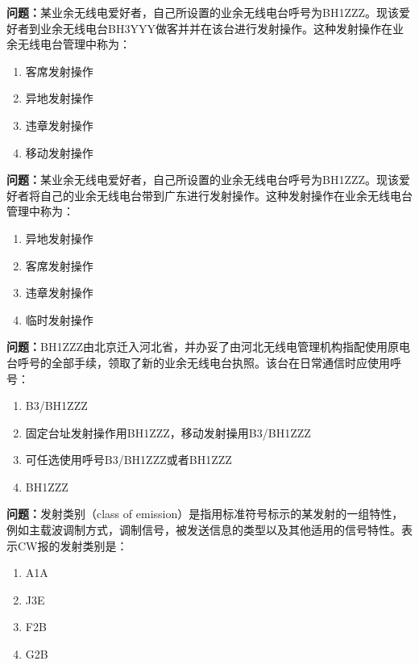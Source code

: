 \bigskip


\noindent\textbf{问题：}某业余无线电爱好者，自己所设置的业余无线电台呼号为BH1ZZZ。现该爱好者到业余无线电台BH3YYY做客并并在该台进行发射操作。这种发射操作在业余无线电台管理中称为：
\begin{enumerate}[label=\Alph*), leftmargin=3em]
\item 客席发射操作
\item 异地发射操作
\item 违章发射操作
\item 移动发射操作
\end{enumerate}

\bigskip


\noindent\textbf{问题：}某业余无线电爱好者，自己所设置的业余无线电台呼号为BH1ZZZ。现该爱好者将自己的业余无线电台带到广东进行发射操作。这种发射操作在业余无线电台管理中称为：
\begin{enumerate}[label=\Alph*), leftmargin=3em]
\item 异地发射操作
\item 客席发射操作
\item 违章发射操作
\item 临时发射操作
\end{enumerate}

\bigskip


\noindent\textbf{问题：}BH1ZZZ由北京迁入河北省，并办妥了由河北无线电管理机构指配使用原电台呼号的全部手续，领取了新的业余无线电台执照。该台在日常通信时应使用呼号：
\begin{enumerate}[label=\Alph*), leftmargin=3em]
\item B3/BH1ZZZ
\item 固定台址发射操作用BH1ZZZ，移动发射操用B3/BH1ZZZ
\item 可任选使用呼号B3/BH1ZZZ或者BH1ZZZ
\item BH1ZZZ
\end{enumerate}

\bigskip


\noindent\textbf{问题：}发射类别（class of emission）是指用标准符号标示的某发射的一组特性，例如主载波调制方式，调制信号，被发送信息的类型以及其他适用的信号特性。表示CW报的发射类别是：
\begin{enumerate}[label=\Alph*), leftmargin=3em]
\item A1A
\item J3E
\item F2B
\item G2B
\end{enumerate}


